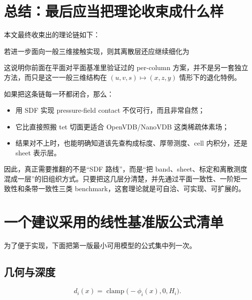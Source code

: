 \documentclass[12pt,a4paper]{ctexart}
\begin{document}
\section{总结：最后应当把理论收束成什么样}

本文最终收束出的理论链如下：
\begin{center}
\end{center}

若进一步面向一般三维接触实现，则其离散层还应继续细化为
\begin{center}
\end{center}
这说明你前面在平面对平面基准里验证过的 per-column 方案，并不是另一套独立方法，而只是这一一般三维结构在 $(u,v,s)\mapsto(x,z,y)$ 情形下的退化特例。

如果把这条链每一环都闭合，那么：
\begin{itemize}
    \item 用 SDF 实现 pressure-field contact 不仅可行，而且非常自然；
    \item 它比直接照搬 tet 切面更适合 OpenVDB/NanoVDB 这类稀疏体素场；
    \item 结果对不上时，也能明确知道该先查构成标度、厚带测度、cell 内积分，还是 sheet 表示层。
\end{itemize}

因此，真正需要推翻的不是“SDF 路线”，而是“把 band、sheet、标定和离散测度混成一层”的旧组织方式。只要把这几层分清楚，并先通过平面一致性、一阶矩一致性和条带一致性三类 benchmark，这套理论就是可自洽、可实现、可扩展的。

\appendix
\section{一个建议采用的线性基准版公式清单}

为了便于实现，下面把第一版最小可用模型的公式集中列一次。

\subsection*{几何与深度}
\begin{equation}
    d_i(x)=\operatorname{clamp}\bigl(-\phi_i(x),0,H_i\bigr).
\end{equation}
\end{document}
